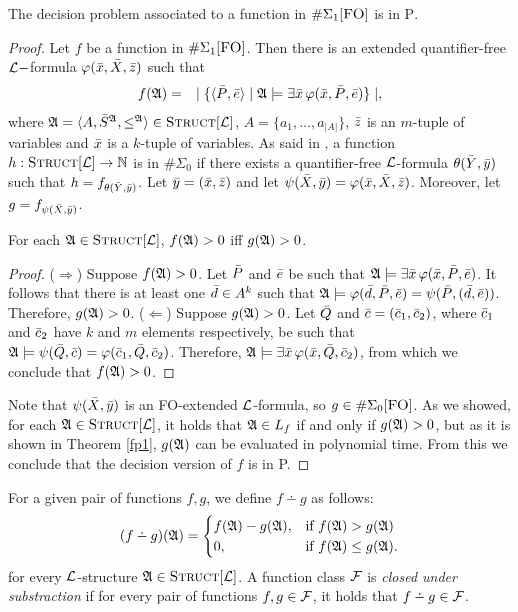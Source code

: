 \begin{theo} \label{decisionptime}
	The decision problem associated to a function in $\E1$ is in \textsc{P}.
\end{theo}
\begin{proof}
	Let $f$ be a function in $\E1$. Then there is an extended quantifier-free $\L-$formula $\varphi(\x,\X,\z)$ such that
	\begin{eqnarray*}
		f(\A) &=& \mid \{ \langle\P,\e\rangle \mid \A \models \exists \x \, \varphi(\x,\P,\e) \} \mid,
	\end{eqnarray*}
	where $\A = \langle A, \S^{\A}, \leq^{\A} \rangle \in \Truc$, $A = \{a_1,\ldots,a_{\vert A \vert}\}$, $\z$ is an $m$-tuple of variables and $\x$ is a $k$-tuple of variables. As said in \cite{DBLP:journals/jcss/SalujaST95}, a function $h:\Truc \to \N$ is in $\#\Sigma_0$ if there exists a quantifier-free $\L$-formula $\theta(\Y,\y)$ such that $h = f_{\theta(\Y,\y)}$. Let $\y = (\x,\z)$ and let $\psi(\X,\y) = \varphi(\x,\X,\z)$. Moreover, let $g = f_{\psi(\X,\y)}$.
	\begin{claim}
		For each $\A \in \Truc$, $f(\A) > 0$ iff $g(\A) > 0$.
	\end{claim}
	\begin{proof}
		($\Rightarrow$) Suppose $f(\A) > 0$. Let $\P$ and $\e$ be such that $\A \models \exists \x \, \varphi(\x,\P,\e)$. It follows that there is at least one $\d \in A^k$ such that $\A \models \varphi(\d,\P,\e) = \psi(\P,(\d,\e))$. Therefore, $g(\A) > 0$. ($\Leftarrow$) Suppose $g(\A) > 0$. Let $\Q$ and $\c = (\c_1,\c_2)$, where $\c_1$ and $\c_2$ have $k$ and $m$ elements respectively, be such that $\A \models \psi(\Q,\c) = \varphi(\c_1,\Q,\c_2)$. Therefore, $\A \models \exists \x \, \varphi(\x,\Q,\c_2)$, from which we conclude that $f(\A) > 0$.
	\end{proof}
	Note that $\psi(\X,\y)$ is an {\sc FO}-extended $\L$-formula, so $g \in\Eo$. As we showed, for each $\A \in \Truc$, it holds that $\A \in L_f$ if and only if $g(\A) > 0$, but as it is shown in Theorem \ref{fp1}, $g(\A)$ can be evaluated in polynomial time. From this we conclude that the decision version of $f$ is in {\sc P}.
\end{proof}

For a given pair of functions $f,g$, we define $f \dotminus g$ as follows:
\begin{eqnarray*}
	(f \dotminus g)(\A) =
	\begin{cases}
		f(\A)-g(\A), & \text{if }f(\A)>g(\A) \\
		0, & \text{if }f(\A) \leq g(\A).
	\end{cases}
\end{eqnarray*}
for every $\L$-structure $\A \in \Truc$. A function class $\F$ is {\em closed under substraction} if for every pair of functions $f,g \in \F$, it holds that $f \dotminus g \in \F$.

